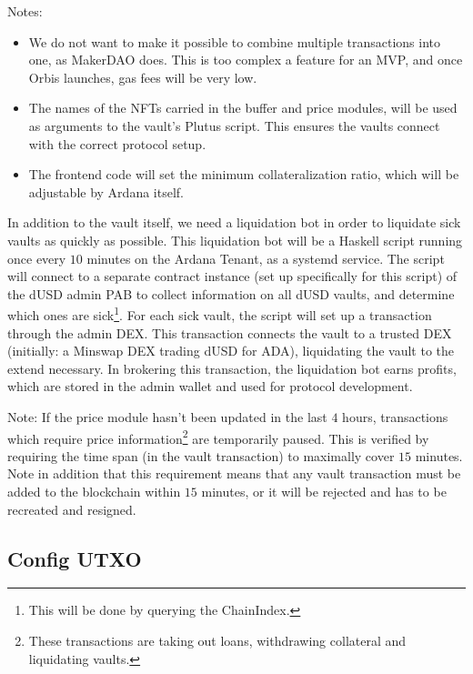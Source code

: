\documentclass{article} %
\begin{document}
Notes:
\begin{itemize}
  \item We do not want to make it possible to combine multiple transactions into
    one, as MakerDAO does.
    This is too complex a feature for an MVP, and once Orbis launches, gas fees
    will be very low.
  \item The names of the NFTs carried in the buffer and price modules, will be
    used as arguments to the vault's Plutus script.
    This ensures the vaults connect with the correct protocol setup.
  \item The frontend code will set the minimum collateralization ratio, which
    will be adjustable by Ardana itself.
\end{itemize}

In addition to the vault itself, we need a liquidation bot in order to liquidate
sick vaults as quickly as possible.
This liquidation bot will be a Haskell script running once every $10$ minutes on
the Ardana Tenant, as a systemd service.
The script will connect to a separate contract instance (set up specifically for
this script) of the dUSD admin PAB to collect information on all dUSD vaults,
and determine which ones are sick\footnote{
  This will be done by querying the ChainIndex.
}.
For each sick vault, the script will set up a transaction through the admin DEX.
This transaction connects the vault to a trusted DEX (initially: a Minswap DEX
trading dUSD for ADA), liquidating the vault to the extend necessary.
In brokering this transaction, the liquidation bot earns profits, which are
stored in the admin wallet and used for protocol development.


Note: If the price module hasn't been updated in the last $4$ hours,
transactions which require price information\footnote{
  These transactions are taking out loans, withdrawing collateral and
  liquidating vaults.
} are temporarily paused. This is verified by requiring the time span (in the
vault transaction) to maximally cover $15$ minutes. Note in addition that this
requirement means that any vault transaction must be added to the blockchain
within $15$ minutes, or it will be rejected and has to be recreated and
resigned.

\subsection{Config UTXO}
\end{document}
